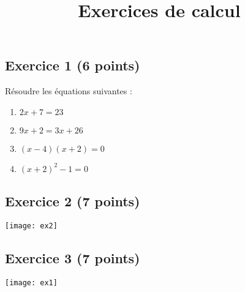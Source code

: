 \documentclass[14 pt, fleqn, pstricks]{extarticle}
\title{Exercices de calcul}
\date{}
\theoremstyle{plain}
\begin{document}
	 


\subsection*{Exercice 1 (6 points) }	 
	 Résoudre les équations suivantes : 
	 \begin{enumerate}
	 \item $ 2 x + 7 = 23$
	 \item $ 9 x + 2 = 3 x + 26$
	 \item $ (x-4)(x+2) = 0$
	 \item $(x+2)^2 - 1 = 0$
	 \end{enumerate}
\subsection*{Exercice 2 (7 points) }	
\texttt{[image: ex2]} 
\subsection*{Exercice 3 (7 points) }	 
\texttt{[image: ex1]} 
	 
 	
\end{document}
